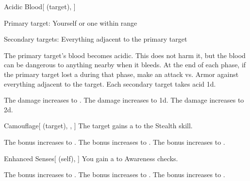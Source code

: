 \lowercase{\hypertarget{spell:Acidic Blood}{}}\label{spell:Acidic Blood}
\begin{attuneability}[Rank 1]{\hypertarget{spell:Acidic Blood}{Acidic Blood}}[ (target), ]

Primary target: Yourself or one  within \rngmed range
\par\noindent
Secondary targets: Everything adjacent to the primary target

The primary target's blood becomes acidic.
This does not harm it, but the blood can be dangerous to anything nearby when it bleeds.
At the end of each phase, if the primary target lost a  during that phase, make an attack vs. Armor against everything adjacent to the target.
\hit Each secondary target takes acid  \minus1d.

\rankline
{} The damage increases to .
 The damage increases to  \plus1d.
 The damage increases to  \plus2d.
\end{attuneability}
\vspace{0.25em}



\lowercase{\hypertarget{spell:Camouflage}{}}\label{spell:Camouflage}
\begin{attuneability}[Rank 1]{\hypertarget{spell:Camouflage}{Camouflage}}[ (target), , ]
The target gains a   to the Stealth skill.

\rankline
{} The bonus increases to .
 The bonus increases to .
 The bonus increases to .
\end{attuneability}
\vspace{0.25em}



\lowercase{\hypertarget{spell:Enhanced Senses}{}}\label{spell:Enhanced Senses}
\begin{attuneability}[Rank 1]{\hypertarget{spell:Enhanced Senses}{Enhanced Senses}}[ (self), ]
You gain a   to Awareness checks.

\rankline
{} The bonus increases to .
 The bonus increases to .
 The bonus increases to .
\end{attuneability}
\vspace{0.25em}



